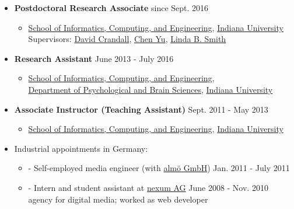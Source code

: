 \documentclass[10pt]{article}
\newenvironment{outerlist}[1][\enskip\textbullet]%
        {\begin{itemize}[#1,leftmargin=*,parsep=5pt,itemsep=0pt,topsep=0pt,partopsep=0pt]}{\end{itemize}%
         \vspace{-.6\baselineskip}}
\newenvironment{innerlist}[1][\enskip\textbullet]%
        {\begin{itemize}[#1,leftmargin=*,parsep=0pt,itemsep=3pt,topsep=-2pt,partopsep=0pt]}
        {\end{itemize}}
\begin{document}
\begin{outerlist}

    \item \textbf{Postdoctoral Research Associate} \hfill {since Sept. 2016}

    \begin{innerlist}
        \item[] \href{https://www.sice.indiana.edu/}{School of Informatics, Computing, and Engineering}, \href{http://www.indiana.edu/}{Indiana University}\\
                Supervisors: \href{http://www.cs.indiana.edu/~djcran/}{David Crandall}, \href{http://psych.indiana.edu/faculty/chenyu.php}{Chen Yu}, \href{http://psych.indiana.edu/faculty/smith4.php}{Linda B. Smith}
    \end{innerlist}

    \item \textbf{Research Assistant} \hfill {June 2013 - July 2016}

    \begin{innerlist}
        \item[] \href{https://www.sice.indiana.edu/}{School of Informatics, Computing, and Engineering},\\
        \href{http://psych.indiana.edu/}{Department of Psychological and Brain Sciences}, \href{http://www.indiana.edu/}{Indiana University}
    \end{innerlist}

    \item \textbf{Associate Instructor (Teaching Assistant)} \hfill {Sept. 2011 - May 2013}
    
    \begin{innerlist}
        \item[] \href{https://www.sice.indiana.edu/}{School of Informatics, Computing, and Engineering}, \href{http://www.indiana.edu/}{Indiana University}
    \end{innerlist}

    \item Industrial appointments in Germany:

    \begin{innerlist}

        \item[-] Self-employed media engineer (with \href{https://www.almoe.de/}{alm{\"o} GmbH}) \hfill Jan. 2011 - July 2011

        \item[-]Intern and student assistant at \href{https://www.nexum.de/en/index}{nexum AG} \hfill {June 2008 - Nov. 2010}\\
        agency for digital media; worked as web developer


\end{innerlist}
\end{outerlist}
\end{document}
